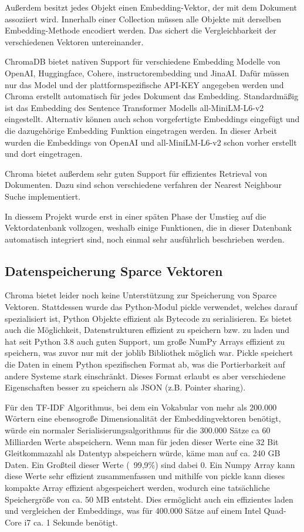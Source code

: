 Außerdem besitzt jedes Objekt einen Embedding-Vektor, der mit dem Dokument assoziiert wird. 
Innerhalb einer Collection müssen alle Objekte mit derselben Embedding-Methode encodiert werden.
Das sichert die Vergleichbarkeit der verschiedenen Vektoren untereinander.

ChromaDB bietet nativen Support für verschiedene Embedding Modelle von OpenAI, Huggingface, Cohere, instructorembedding und JinaAI.
Dafür müssen nur das Model und der plattformspezifische API-KEY angegeben werden und Chroma erstellt automatisch für jedes Dokument das Embedding.
Standardmäßig ist das Embedding des Sentence Transformer Modells all-MiniLM-L6-v2 eingestellt.
Alternativ können auch schon vorgefertigte Embeddings eingefügt und die dazugehörige Embedding Funktion eingetragen werden.
In dieser Arbeit wurden die Embeddings von OpenAI und all-MiniLM-L6-v2 schon vorher erstellt und dort eingetragen.

Chroma bietet außerdem sehr guten Support für effizientes Retrieval von Dokumenten.
Dazu sind schon verschiedene verfahren der Nearest Neighbour Suche implementiert.
 

In diessem Projekt wurde erst in einer späten Phase der Umstieg auf die Vektordatenbank vollzogen, weshalb einige Funktionen, die in dieser Datenbank automatisch integriert sind, noch einmal sehr ausführlich beschrieben werden.


\subsection{Datenspeicherung Sparce Vektoren}

Chroma bietet leider noch keine Unterstützung zur Speicherung von Sparce Vektoren.
Stattdessen wurde das Python-Modul pickle verwendet, welches darauf spezialisiert ist, Python Objekte effizient als Bytecode zu serialisieren. 
Es bietet auch die Möglichkeit, Datenstrukturen effizient zu speichern bzw. zu laden und hat seit Python 3.8 auch guten Support, um große NumPy Arrays effizient zu speichern, was zuvor nur mit der joblib Bibliothek möglich war.
Pickle speichert die Daten in einem Python spezifischen Format ab, was die Portierbarkeit auf andere Systeme stark einschränkt. Dieses Format erlaubt es aber verschiedene Eigenschaften besser zu speichern als JSON (z.B. Pointer sharing).

Für den TF-IDF Algorithmus, bei dem ein Vokabular von mehr als 200.000 Wörtern eine ebensogroße Dimensionalität der Embeddingvektoren benötigt, würde ein normaler Serialisierungsalgorithmus für die 300.000 Sätze ca 60 Milliarden Werte abspeichern.
Wenn man für jeden dieser Werte eine 32 Bit Gleitkommazahl als Datentyp abspeichern würde, käme man auf ca. 240 GB Daten. 
Ein Großteil dieser Werte (~99,9\%) sind dabei 0.
Ein Numpy Array kann diese Werte sehr effizient zusammenfassen und mithilfe von pickle kann dieses kompakte Array effizient abgespeichert werden, wodurch eine tatsächliche Speichergröße von ca. 50 MB entsteht.
Dies ermöglicht auch ein effizientes laden und vergleichen der Embeddings, was für 400.000 Sätze auf einem Intel Quad-Core i7 ca. 1 Sekunde benötigt.

